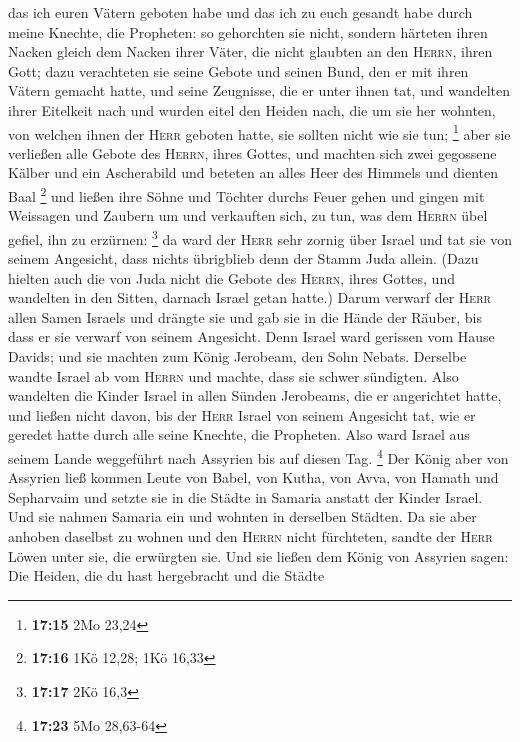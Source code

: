 das ich euren Vätern geboten habe und das ich zu euch gesandt habe durch
meine Knechte, die Propheten:  so gehorchten sie nicht,
sondern härteten ihren Nacken gleich dem Nacken ihrer Väter, die nicht
glaubten an den \textsc{Herrn}, ihren Gott;  dazu
verachteten sie seine Gebote und seinen Bund, den er mit ihren Vätern
gemacht hatte, und seine Zeugnisse, die er unter ihnen tat, und
wandelten ihrer Eitelkeit nach und wurden eitel den Heiden nach, die um
sie her wohnten, von welchen ihnen der \textsc{Herr} geboten hatte, sie
sollten nicht wie sie tun; \footnote{\textbf{17:15} 2Mo 23,24}
 aber sie verließen alle Gebote des \textsc{Herrn}, ihres
Gottes, und machten sich zwei gegossene Kälber und ein Ascherabild und
beteten an alles Heer des Himmels und dienten Baal \footnote{\textbf{17:16}
  1Kö 12,28; 1Kö 16,33}  und ließen ihre Söhne und
Töchter durchs Feuer gehen und gingen mit Weissagen und Zaubern um und
verkauften sich, zu tun, was dem \textsc{Herrn} übel gefiel, ihn zu
erzürnen: \footnote{\textbf{17:17} 2Kö 16,3}  da ward der
\textsc{Herr} sehr zornig über Israel und tat sie von seinem Angesicht,
dass nichts übrigblieb denn der Stamm Juda allein.  (Dazu
hielten auch die von Juda nicht die Gebote des \textsc{Herrn}, ihres
Gottes, und wandelten in den Sitten, darnach Israel getan hatte.)
 Darum verwarf der \textsc{Herr} allen Samen Israels und
drängte sie und gab sie in die Hände der Räuber, bis dass er sie verwarf
von seinem Angesicht.  Denn Israel ward gerissen vom
Hause Davids; und sie machten zum König Jerobeam, den Sohn Nebats.
Derselbe wandte Israel ab vom \textsc{Herrn} und machte, dass sie schwer
sündigten.  Also wandelten die Kinder Israel in allen
Sünden Jerobeams, die er angerichtet hatte, und ließen nicht davon,
 bis der \textsc{Herr} Israel von seinem Angesicht tat,
wie er geredet hatte durch alle seine Knechte, die Propheten. Also ward
Israel aus seinem Lande weggeführt nach Assyrien bis auf diesen Tag.
\footnote{\textbf{17:23} 5Mo 28,63-64}  Der König aber
von Assyrien ließ kommen Leute von Babel, von Kutha, von Avva, von
Hamath und Sepharvaim und setzte sie in die Städte in Samaria anstatt
der Kinder Israel. Und sie nahmen Samaria ein und wohnten in derselben
Städten.  Da sie aber anhoben daselbst zu wohnen und den
\textsc{Herrn} nicht fürchteten, sandte der \textsc{Herr} Löwen unter
sie, die erwürgten sie.  Und sie ließen dem König von
Assyrien sagen: Die Heiden, die du hast hergebracht und die Städte

